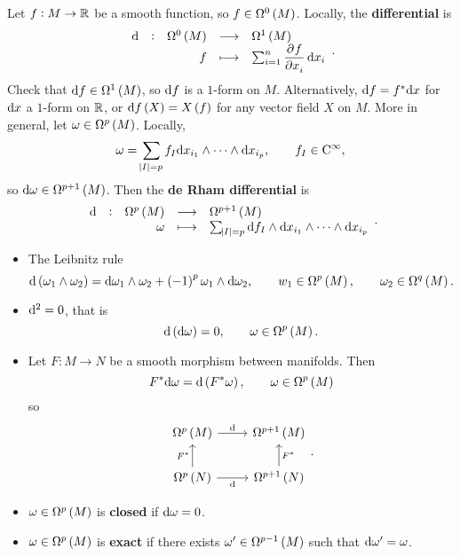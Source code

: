 Let $ f : M \to \mathbb{R} $ be a smooth function, so $ f \in \Omega^0\br{M} $. Locally, the \textbf{differential} is
$$ \function[\d]{\Omega^0\br{M}}{\Omega^1\br{M}}{f}{\sum_{i = 1}^n \dpd{f}{x_i} \d x_i}. $$
Check that $ \d f \in \Omega^1\br{M} $, so $ \mathrm{d} f $ is a $ 1 $-form on $ M $. Alternatively, $ \mathrm{d} f = f^*\mathrm{d} x $ for $ \mathrm{d} x $ a $ 1 $-form on $ \mathbb{R} $, or $ \d f\br{X} = X\br{f} $ for any vector field $ X $ on $ M $. More in general, let $ \omega \in \Omega^p\br{M} $. Locally,
$$ \omega = \sum_{\abs{I} = p} f_I \mathrm{d} x_{i_1} \wedge \dots \wedge \mathrm{d} x_{i_p}, \qquad f_I \in \mathrm{C}^\infty, $$
so $ \d\omega \in \Omega^{p + 1}\br{M} $. Then the \textbf{de Rham differential} is
$$ \function[\d]{\Omega^p\br{M}}{\Omega^{p + 1}\br{M}}{\omega}{\sum_{\abs{I} = p} \d f_I \wedge \d x_{i_1} \wedge \dots \wedge \d x_{i_p}}. $$

\pagebreak

\begin{proposition}
\label{prop:1.16}
\hfill
\begin{itemize}
\item The Leibnitz rule
$$ \d\br{\omega_1 \wedge \omega_2} = \d\omega_1 \wedge \omega_2 + \br{-1}^p\omega_1 \wedge \d\omega_2, \qquad w_1 \in \Omega^p\br{M}, \qquad \omega_2 \in \Omega^q\br{M}. $$
\item $ \mathrm{d}^2 = 0 $, that is
$$ \d\br{\d\omega} = 0, \qquad \omega \in \Omega^p\br{M}. $$
\item Let $ F : M \to N $ be a smooth morphism between manifolds. Then
$$ F^*\d\omega = \d\br{F^*\omega}, \qquad \omega \in \Omega^p\br{M} $$
so
$$
\begin{tikzcd}
\Omega^p\br{M} \arrow{r}{\d} & \Omega^{p + 1}\br{M} \\
\Omega^p\br{N} \arrow{u}{F^*} \arrow[swap]{r}{\d} & \Omega^{p + 1}\br{N} \arrow[swap]{u}{F^*}
\end{tikzcd}.
$$
\end{itemize}
\end{proposition}


\begin{definition}
\hfill
\begin{itemize}
\item $ \omega \in \Omega^p\br{M} $ is \textbf{closed} if $ \mathrm{d}\omega = 0 $.
\item $ \omega \in \Omega^p\br{M} $ is \textbf{exact} if there exists $ \omega' \in \Omega^{p - 1}\br{M} $ such that $ \mathrm{d}\omega' = \omega $.
\end{itemize}
\end{definition}


